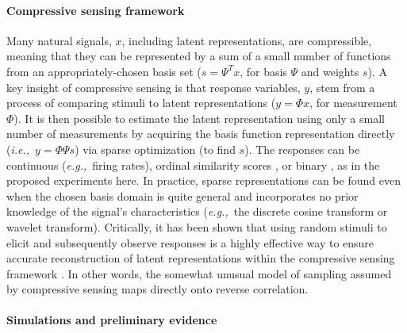\documentclass[11pt, notitlepage]{article} %
\def\eg{{\emph{e.g.,}}~}
\def\ie{{\emph{i.e.,}}~}
\begin{document}


\paragraph{Compressive sensing framework}

Many natural signals, $x$, including latent representations, are compressible,
meaning that they can be represented by a sum of a small number of functions
from an appropriately-chosen basis set ($s = \Psi^{T}x$, for basis $\Psi$ and weights $s$).
A key insight of compressive sensing is that response variables, $y$,
stem from a process of comparing stimuli to latent representations
($y = \Phi x$, for measurement $\Phi$).
It is then possible to estimate the latent representation
using only a small number of measurements
by acquiring the basis function representation directly (\ie $ y = \Phi \Psi s$)
via sparse optimization (to find $s$).
The responses can be continuous (\eg firing rates),
ordinal similarity scores
\cite{zymnisCompressedSensingQuantized2010},
or binary \cite{boufounos1BitCompressiveSensing2008,planOneBitCompressedSensing2013},
as in the proposed experiments here.
In practice, sparse representations can be found even when the chosen basis domain is quite general
and incorporates no prior knowledge of the signal's characteristics
(\eg the discrete cosine transform or wavelet transform).
Critically, it has been shown that using random stimuli to elicit
and subsequently observe responses
is a highly effective way to ensure accurate reconstruction of latent representations
within the compressive sensing framework
\cite{candesIntroductionCompressiveSampling2008,candesRestrictedIsometryProperty2008,wojtaszczykStabilityInstanceOptimality2010}.
In other words, the somewhat
unusual model of sampling assumed by compressive sensing maps directly onto reverse correlation. 

\paragraph{Simulations and preliminary evidence}
\end{document}
